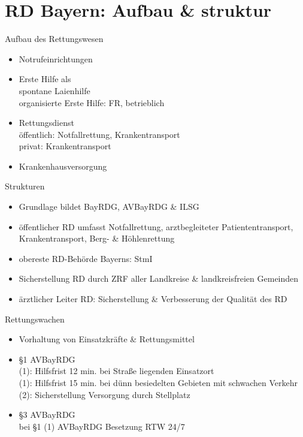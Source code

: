 \section{RD Bayern: Aufbau \& struktur}
\begin{sectionbox}{Aufbau des Rettungswesen}
    \begin{itemize}
        \item Notrufeinrichtungen
        \item Erste Hilfe als\\
        \ra spontane Laienhilfe\\
        \ra organisierte Erste Hilfe: FR, betrieblich
        \item Rettungsdienst\\
        \ra öffentlich: Notfallrettung, Krankentransport\\
        \ra privat: Krankentransport
        \item Krankenhausversorgung
    \end{itemize}
\end{sectionbox}
\begin{sectionbox}{Strukturen}
    \begin{itemize}
        \item Grundlage bildet BayRDG, AVBayRDG \& ILSG
        \item öffentlicher RD umfasst Notfallrettung, arztbegleiteter Patiententransport, Krankentransport, Berg- \& Höhlenrettung
        \item obereste RD-Behörde Bayerns: StmI
        \item Sicherstellung RD durch ZRF aller Landkreise \& landkreisfreien Gemeinden
        \item ärztlicher Leiter RD: Sicherstellung \& Verbesserung der Qualität des RD
    \end{itemize}
\end{sectionbox}
\begin{sectionbox}{Rettungswachen}
    \begin{itemize}
        \item Vorhaltung von Einsatzkräfte \& Rettungsmittel
        \item §1 AVBayRDG\\
        \ra (1): Hilfsfrist 12 min. bei Straße liegenden Einsatzort\\
        \ra (1): Hilfsfrist 15 min. bei dünn besiedelten Gebieten mit schwachen Verkehr\\
        \ra (2): Sicherstellung Versorgung durch Stellplatz
        \item §3 AVBayRDG\\
        \ra bei §1 (1) AVBayRDG Besetzung RTW 24/7
    \end{itemize}
\end{sectionbox}